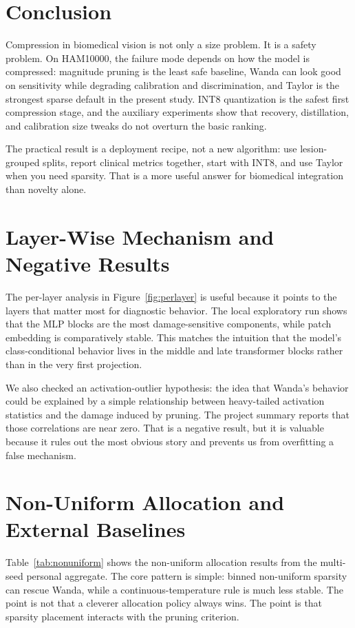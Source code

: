 \documentclass{article}
\begin{document}
\section{Conclusion}
Compression in biomedical vision is not only a size problem. It is a safety problem. On HAM10000, the failure mode depends on how the model is compressed: magnitude pruning is the least safe baseline, Wanda can look good on sensitivity while degrading calibration and discrimination, and Taylor is the strongest sparse default in the present study. INT8 quantization is the safest first compression stage, and the auxiliary experiments show that recovery, distillation, and calibration size tweaks do not overturn the basic ranking.

The practical result is a deployment recipe, not a new algorithm: use lesion-grouped splits, report clinical metrics together, start with INT8, and use Taylor when you need sparsity. That is a more useful answer for biomedical integration than novelty alone.

\appendix
\section{Layer-Wise Mechanism and Negative Results}
The per-layer analysis in Figure~\ref{fig:perlayer} is useful because it points to the layers that matter most for diagnostic behavior. The local exploratory run shows that the MLP blocks are the most damage-sensitive components, while patch embedding is comparatively stable. This matches the intuition that the model's class-conditional behavior lives in the middle and late transformer blocks rather than in the very first projection.

We also checked an activation-outlier hypothesis: the idea that Wanda's behavior could be explained by a simple relationship between heavy-tailed activation statistics and the damage induced by pruning. The project summary reports that those correlations are near zero. That is a negative result, but it is valuable because it rules out the most obvious story and prevents us from overfitting a false mechanism.

\section{Non-Uniform Allocation and External Baselines}
Table~\ref{tab:nonuniform} shows the non-uniform allocation results from the multi-seed personal aggregate. The core pattern is simple: binned non-uniform sparsity can rescue Wanda, while a continuous-temperature rule is much less stable. The point is not that a cleverer allocation policy always wins. The point is that sparsity placement interacts with the pruning criterion.
\end{document}
